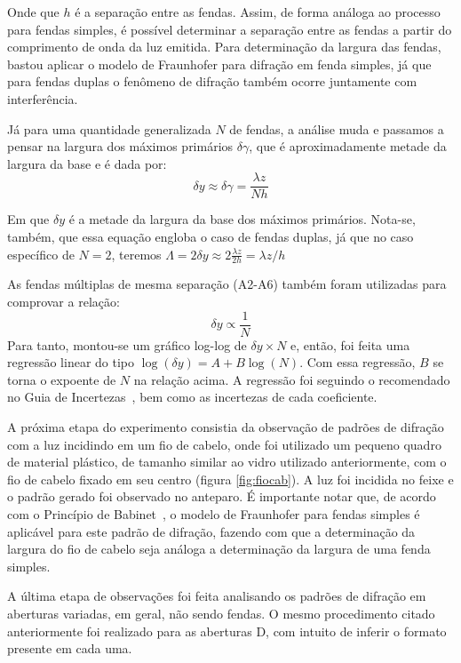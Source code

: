 Onde que $h$ é a separação entre as fendas. Assim, de forma análoga ao processo para fendas simples, é possível determinar a separação entre as fendas a partir do comprimento de onda da luz emitida. Para determinação da largura das fendas, bastou aplicar o modelo de Fraunhofer para difração em fenda simples, já que para fendas duplas o fenômeno de difração também ocorre juntamente com interferência.

Já para uma quantidade generalizada $N$ de fendas, a análise muda e passamos a pensar na largura dos máximos primários $\delta\gamma$, que é aproximadamente metade da largura da base e é dada por:
\begin{equation}
    \delta y \approx \delta\gamma = \frac{\lambda z}{N h} \label{eq:mult}
\end{equation}

Em que $\delta y$ é a metade da largura da base dos máximos primários. Nota-se, também, que essa equação engloba o caso de fendas duplas, já que no caso específico de $N = 2$, teremos $\Lambda = 2 \delta y \approx 2 \frac{\lambda z}{2 h} = \lambda z / h$

As fendas múltiplas de mesma separação (A2-A6) também foram utilizadas para comprovar a relação: $$\delta y \propto \frac{1}{N} \label{rel:dyn}$$ Para tanto, montou-se um gráfico log-log de $\delta y \times N$ e, então, foi feita uma regressão linear do tipo $\log(\delta y) = A + B \log(N)$. Com essa regressão, $B$ se torna o expoente de $N$ na relação acima. A regressão foi seguindo o recomendado no Guia de Incertezas~\cite{ref:gum}, bem como as incertezas de cada coeficiente.

A próxima etapa do experimento consistia da observação de padrões de difração com a luz incidindo em um fio de cabelo, onde foi utilizado um pequeno quadro de material plástico, de tamanho similar ao vidro utilizado anteriormente, com o fio de cabelo fixado em seu centro (figura \ref{fig:fiocab}). A luz foi incidida no feixe e o padrão gerado foi observado no anteparo. É importante notar que, de acordo com o Princípio de Babinet~\cite{ref:wolf}, o modelo de Fraunhofer para fendas simples é aplicável para este padrão de difração, fazendo com que a determinação da largura do fio de cabelo seja análoga a determinação da largura de uma fenda simples.



A última etapa de observações foi feita analisando os padrões de difração em aberturas variadas, em geral, não sendo fendas. O mesmo procedimento citado anteriormente foi realizado para as aberturas D, com intuito de inferir o formato presente em cada uma.

